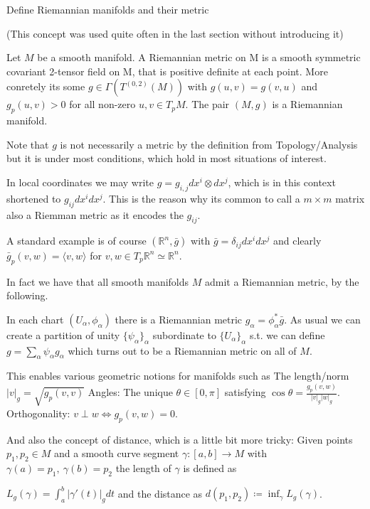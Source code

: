 Define Riemannian manifolds and their metric

(This concept was used quite often in the last section without introducing it)

Let \( M \) be a smooth manifold. A Riemannian metric on M
is a smooth symmetric covariant 2-tensor field on M, that is positive definite at each point.
More conretely its some \( g \in \Gamma(T^{(0,2)}(M)) \) with \( g(u,v) = g(v,u) \)
and \( g_p(u,v) > 0 \) for all non-zero \( u,v \in T_pM \).
The pair \( (M,g) \) is a Riemannian manifold.

Note that \( g \) is not necessarily a metric by the definition from Topology/Analysis
but it is under most conditions, which hold in most situations of interest.

In local coordinates we may write \( g = g_{i,j} dx^i \otimes dx^j \), which is in this 
context shortened to \( g_{ij}dx^idx^j \). This is the reason why its common to call
a \( m \times m \) matrix also a Riemman metric as it encodes the \( g_{ij} \).

A standard example is of course \( (\mathbb{R}^n, \bar{g}) \) with
\( \bar{g} = \delta_{ij}dx^idx^j \) and clearly \( \bar{g}_p(v,w) = \langle v, w \rangle \)
for \( v, w \in T_p \mathbb{R}^n \simeq \mathbb{R}^n \).

In fact we have that all smooth manifolds \( M \) admit a Riemannian metric,
by the following.

In each chart \( (U_{\alpha}, \phi_\alpha) \) there is a Riemannian metric
\( g_\alpha = \phi^\ast_{\alpha}\bar{g} \). As usual we can create a partition of unity
\( \{\psi_\alpha\}_{\alpha} \) subordinate to \( \{U_\alpha\}_{\alpha} \) s.t. we can
define
\( g = \sum_{\alpha} \psi_\alpha g_{\alpha} \)
which turns out to be a Riemannian metric on all of \( M \).

This enables various geometric notions for manifolds such as
The length/norm
\( |v|_g = \sqrt{g_p(v, v)} \)
Angles: The unique \( \theta \in [0, \pi] \) satisfying
\( \cos \theta = \frac{g_p(v, w)}{|v|_g|w|_g}\).
Orthogonality:
\( v \perp w \iff g_p(v,w) = 0 \).

And also the concept of distance, which is a little bit more tricky:
Given points \( p_1,p_2 \in M \) and a smooth curve segment \( \gamma : [a, b] \to M \)
with \( \gamma(a) = p_1,\ \gamma(b) = p_2 \) the length of \( \gamma \) is defined as 

\( L_g(\gamma) = \int_{a}^{b} |\gamma'(t)|_g dt \)
and the distance as 
\( d(p_1, p_2) \coloneqq \inf_{\gamma} L_g(\gamma) \).

